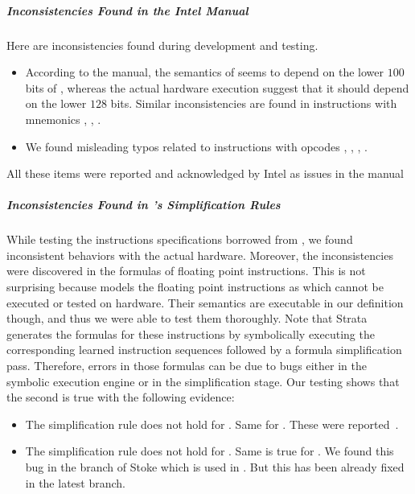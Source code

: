 \subparagraph{Inconsistencies Found in the Intel Manual} Here are inconsistencies found during development and testing.  
\begin{itemize}%
    \item According to the manual, the semantics of   seems to depend on the lower $100$ bits of , whereas the actual hardware execution suggest that it should depend on the lower $128$ bits. Similar inconsistencies are found in instructions with mnemonics , , .
    
    \item We found misleading typos related to instructions with opcodes , , , .    
\end{itemize}
All these items were reported and acknowledged by Intel as issues in the manual~\cite{BugIntel}
 
\subparagraph{Inconsistencies Found in \Strata's Simplification Rules}
While testing the instructions specifications borrowed from \Strata, we found inconsistent behaviors with the actual hardware. Moreover, the inconsistencies were discovered in the formulas of floating point instructions. This is not surprising because \Strata models the floating point instructions as \uif{} which cannot be executed or tested on hardware. Their semantics are executable in our definition though, and thus we were able to test them thoroughly. Note that Strata generates the formulas for these instructions by symbolically  executing  the corresponding learned  instruction sequences followed by a formula simplification pass. Therefore, errors in those formulas can be due to bugs either in the symbolic execution engine or in the simplification stage. Our testing shows that the second is true with the following evidence:
  \begin{itemize}%
      \item The simplification rule  does not hold for . Same for . These were reported~\cite{PC1}.
       
      \item The simplification rule  does not hold for .  Same is true for . We found this bug in the  branch of Stoke which is used in \Strata. But this has been already fixed in the latest \Stoke branch.
  \end{itemize}

